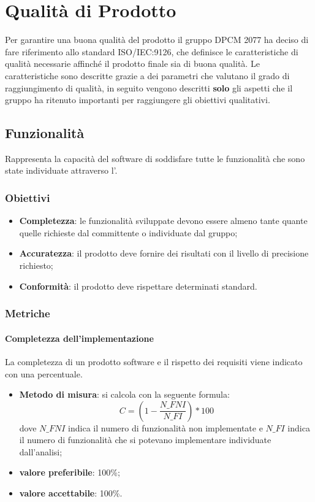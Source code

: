 \section{Qualità di Prodotto}

Per garantire una buona qualità del prodotto il gruppo DPCM 2077 ha deciso di fare riferimento allo standard ISO/IEC:9126,
che definisce le caratteristiche di qualità necessarie affinché il prodotto finale sia di buona qualità.
Le caratteristiche sono descritte grazie a dei parametri che valutano il grado di raggiungimento di qualità, in seguito vengono descritti \textbf{solo} gli aspetti che il gruppo ha ritenuto importanti per raggiungere gli obiettivi qualitativi.

\subsection{Funzionalità}
Rappresenta la capacità del software di soddisfare tutte le funzionalità che sono state individuate attraverso l'.
\subsubsection{Obiettivi}
\begin{itemize}
\item {\textbf{Completezza}: le funzionalità sviluppate devono essere almeno tante quante quelle richieste dal committente o individuate dal gruppo;}
\item {\textbf{Accuratezza}: il prodotto deve fornire dei risultati con il livello di precisione richiesto;}
\item {\textbf{Conformità}: il prodotto deve rispettare determinati standard.} 
\end{itemize}

\subsubsection{Metriche}
\paragraph{Completezza dell'implementazione}
La completezza di un prodotto software e il rispetto dei requisiti viene indicato con una percentuale.
\begin{itemize}
\item \textbf{Metodo di misura}: si calcola con la seguente formula:
\[C = (1- \frac{N\_FNI}{N\_FI}) * 100\]
dove $N\_FNI$ indica il numero di funzionalità non implementate e $N\_FI$ indica il numero di funzionalità che si potevano implementare individuate dall'analisi;
\item \textbf{valore preferibile}: 100\%;
\item \textbf{valore accettabile}: 100\%.
\end{itemize}

